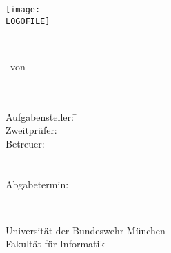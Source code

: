 \documentclass[../main]{subfiles}
\begin{document}
\begin{center}

\vspace*{1cm}

\texttt{[image: \\LOGOFILE]}

\vspace{1.5cm}
{\Huge %
\textbf{\Dtitel}\\ %
} %
\vspace{1.5cm}


{\Large %
\Darbeit \ von\\ %
\Dname\\ %
\Dnummer\\ %
}%
\vspace{2cm}

\parbox{1cm}{
\begin{large}
\begin{tabbing}
Aufgabensteller: \hspace{.5cm} \= \Dprofa \\[2mm]
Zweitprüfer: \> \Dprofb \\[2mm]
Betreuer:
\> \Dbetreuera \\ %
\> \Dbetreuerb \\
\> \Dbetreuerc \\[5mm]
Abgabetermin: \> \Dday \\
\end{tabbing}
\end{large}}\\
\vspace{5mm}

\vfill

{\Large %
Universität der Bundeswehr München\\
Fakultät für Informatik\\
}

\end{center}
\end{document}
